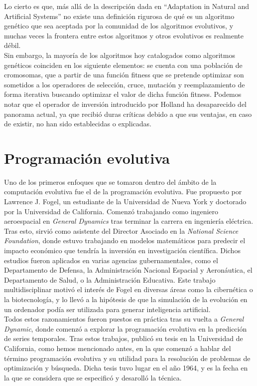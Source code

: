 \documentclass[12pt]{article} \usepackage[utf8x]{inputenc}
\begin{document}
Lo cierto es que, más allá de la descripción dada en ``Adaptation in
Natural and Artificial Systems'' no existe una definición rigurosa de
qué es un algoritmo genético que sea aceptada por la comunidad de los
algoritmos evolutivos, y muchas veces la frontera entre estos
algoritmos y otros evolutivos es
realmente débil. \\

Sin embargo, la mayoría de los algoritmos hoy catalogados como
algoritmos genéticos coinciden en los siguiente elementos: se cuenta
con una población de cromosomas, que a partir de una función fitness
que se pretende optimizar son sometidos a los operadores de selección,
cruce, mutación y reemplazamiento de forma iterativa buscando
optimizar el valor de dicha función fitness.  Podemos notar que el
operador de inversión introducido por Holland ha desaparecido del
panorama actual, ya que recibió duras críticas debido a que sus
ventajas, en caso de existir, no han
sido establecidas o explicadas.\\


\section{Programación evolutiva}

Uno de los primeros enfoques que se tomaron dentro del ámbito de la
computación evolutiva fue el de la programación evolutiva. Fue
propuesto por Lawrence J. Fogel, un estudiante de la Universidad de
Nueva York y doctorado por la Universidad de California. Comenzó
trabajando como ingeniero aeroespacial en \textit{General Dynamics}
tras terminar la carrera en ingeniería eléctrica. Tras esto, sirvió
como asistente del Director Asociado en la \textit{National Science
  Foundation}, donde estuvo trabajando en modelos matemáticos para
predecir el impacto económico que tendría la inversión en
investigación científica.  Dichos estudios fueron aplicados en varias
agencias gubernamentales, como el Departamento de Defensa, la
Administración Nacional Espacial y Aeronáutica, el Departamento de
Salud, o la Administración Educativa. Este trabajo multidisciplinar
motivó el interés de Fogel en diversas áreas como la cibernética o la
biotecnología, y lo llevó a la hipótesis de que la simulación de la
evolución en un ordenador podía ser utilizada para generar
inteligencia artificial.\\

Todos estos razonamientos fueron puestos en práctica tras su vuelta a
\textit{General Dynamic}, donde comenzó a explorar la programación
evolutiva en la predicción de series temporales. Tras estos trabajos,
publicó su tesis en la Universidad de California, como hemos
mencionado antes, en la que comenzó a hablar del término programación
evolutiva y su utilidad para la resolución de problemas de
optimización y búsqueda. Dicha tesis tuvo lugar en el año 1964, y es
la fecha en la que se considera que se especificó y desarolló la
técnica.\\
\end{document}
